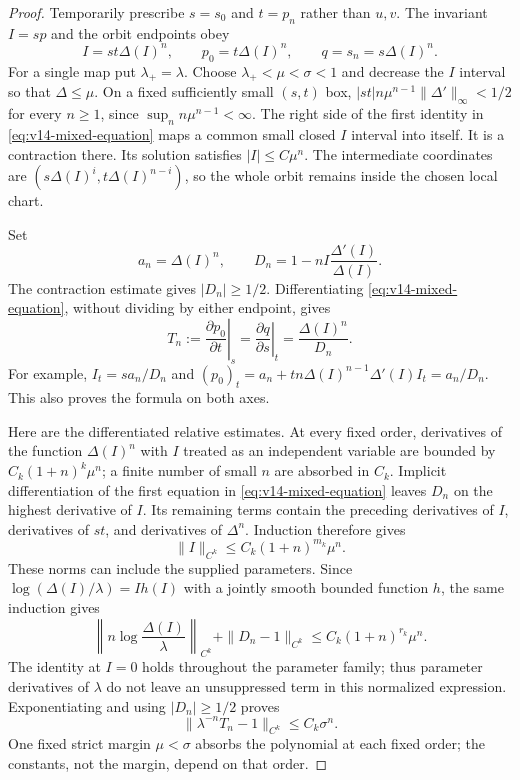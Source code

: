 \begin{proof}
Temporarily prescribe $s=s_0$ and $t=p_n$ rather than $u,v$.
The invariant $I=sp$ and the orbit endpoints obey
\begin{equation}\label{eq:v14-mixed-equation}
 I=st\Delta(I)^n,\qquad
 p_0=t\Delta(I)^n,\qquad q=s_n=s\Delta(I)^n.
\end{equation}
For a single map put $\lambda_+=\lambda$. Choose
$\lambda_+<\mu<\sigma<1$ and decrease the $I$ interval so
that $\Delta\le\mu$. On a fixed sufficiently small $(s,t)$ box,
$|st|n\mu^{n-1}\|\Delta'\|_\infty<1/2$ for every $n\ge1$,
since $\sup_n n\mu^{n-1}<\infty$. The right side of the first
identity in \eqref{eq:v14-mixed-equation} maps a common small closed
$I$ interval into itself. It is a contraction there. Its solution
satisfies $|I|\le C\mu^n$. The intermediate coordinates are
$(s\Delta(I)^i,t\Delta(I)^{n-i})$, so the whole orbit remains
inside the chosen local chart.

Set
\[
 a_n=\Delta(I)^n,\qquad
 D_n=1-nI\frac{\Delta'(I)}{\Delta(I)}.
\]
The contraction estimate gives $|D_n|\ge1/2$. Differentiating
\eqref{eq:v14-mixed-equation}, without dividing by either endpoint,
gives
\begin{equation}\label{eq:v14-exact-mixed-flux}
 T_n:=\left.\frac{\partial p_0}{\partial t}\right|_s
      =\left.\frac{\partial q}{\partial s}\right|_t
      =\frac{\Delta(I)^n}{D_n}.
\end{equation}
For example, $I_t=sa_n/D_n$ and
$(p_0)_t=a_n+tn\Delta(I)^{n-1}\Delta'(I)I_t=a_n/D_n$.
This also proves the formula on both axes.

Here are the differentiated relative estimates. At every fixed order,
derivatives of the function $\Delta(I)^n$ with $I$ treated as an
independent variable are bounded by $C_k(1+n)^k\mu^n$; a finite
number of small $n$ are absorbed in $C_k$. Implicit differentiation
of the first equation in \eqref{eq:v14-mixed-equation} leaves $D_n$
on the highest derivative of $I$. Its remaining terms contain the
preceding derivatives of $I$, derivatives of $st$, and derivatives of
$\Delta^n$. Induction therefore gives
\[
 \|I\|_{C^k}\le C_k(1+n)^{m_k}\mu^n.
\]
These norms can include the supplied parameters. Since
$\log(\Delta(I)/\lambda)=Ih(I)$ with a jointly smooth bounded
function $h$, the same induction gives
\[
 \left\|n\log\frac{\Delta(I)}\lambda\right\|_{C^k}
       +\|D_n-1\|_{C^k}\le C_k(1+n)^{r_k}\mu^n.
\]
The identity at $I=0$ holds throughout the parameter family; thus
parameter derivatives of $\lambda$ do not leave an unsuppressed
term in this normalized expression. Exponentiating and using
$|D_n|\ge1/2$ proves
\begin{equation}\label{eq:v14-normalized-T}
             \|\lambda^{-n}T_n-1\|_{C^k}\le C_k\sigma^n.
\end{equation}
One fixed strict margin $\mu<\sigma$ absorbs the polynomial at
each fixed order; the constants, not the margin, depend on that order.


\end{proof}
